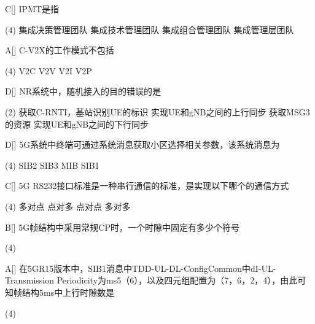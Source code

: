 \begin{choice}{C}[]
    IPMT是指
    \begin{tasks}(4)
        \task 集成决策管理团队
        \task 集成技术管理团队
        \task 集成组合管理团队
        \task 集成管理层团队
    \end{tasks}
\end{choice}

\begin{choice}{A}[]
    C-V2X的工作模式不包括
    \begin{tasks}(4)
        \task V2C
        \task V2V
        \task V2I
        \task V2P
    \end{tasks}
\end{choice}




\begin{choice}{D}[]
    NR系统中，随机接入的目的错误的是
    \begin{tasks}(2)
        \task 获取C-RNTI，基站识别UE的标识
        \task 实现UE和gNB之间的上行同步
        \task 获取MSG3的资源
        \task 实现UE和gNB之间的下行同步
    \end{tasks}
\end{choice}


\begin{choice}{D}[]
    5G系统中终端可通过系统消息获取小区选择相关参数，该系统消息为
    \begin{tasks}(4)
        \task SIB2
        \task SIB3
        \task MIB
        \task SIB1
    \end{tasks}
\end{choice}


\begin{choice}{C}[]
    5G RS232接口标准是一种串行通信的标准，是实现以下哪个的通信方式
    \begin{tasks}(4)
        \task 多对点
        \task 点对多
        \task 点对点
        \task 多对多
    \end{tasks}
\end{choice}


\begin{choice}{B}[]
    5G帧结构中采用常规CP时，一个时隙中固定有多少个符号
    \begin{tasks}(4)
    \end{tasks}
\end{choice}

\begin{choice}{A}[]
    在5GR15版本中，SIB1消息中TDD-UL-DL-ConfigCommon中dI-UL-
    Transmission Periodicity为ms5（6），以及四元组配置为（7，6，2，4），由此可知帧结构5ms中上行时隙数是
    \begin{tasks}(4)
    \end{tasks}
\end{choice}


